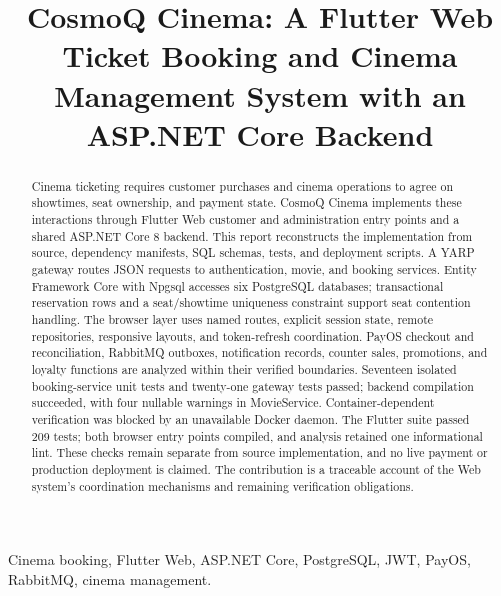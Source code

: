 \documentclass[conference]{IEEEtran}
\begin{document}
\title{CosmoQ Cinema: A Flutter Web Ticket Booking and Cinema Management System with an ASP.NET Core Backend}
\author{
}
\maketitle
\begin{abstract}
Cinema ticketing requires customer purchases and cinema operations to agree on
showtimes, seat ownership, and payment state. CosmoQ Cinema implements these
interactions through Flutter Web customer and administration entry points and
a shared ASP.NET Core 8 backend. This report reconstructs the implementation
from source, dependency manifests, SQL schemas, tests, and deployment scripts.
A YARP gateway routes JSON requests to authentication, movie, and booking
services. Entity Framework Core with Npgsql accesses six PostgreSQL databases;
transactional reservation rows and a seat/showtime uniqueness constraint support
seat contention handling. The browser layer uses named routes, explicit session
state, remote repositories, responsive layouts, and token-refresh coordination.
PayOS checkout and reconciliation, RabbitMQ outboxes, notification records,
counter sales, promotions, and loyalty functions are analyzed within their
verified boundaries. Seventeen isolated booking-service unit tests and
twenty-one gateway tests passed; backend compilation succeeded, with four
nullable warnings in MovieService. Container-dependent verification was blocked
by an unavailable Docker daemon. The Flutter suite passed 209 tests; both browser entry points compiled,
and analysis retained one informational lint. These checks remain separate
from source implementation, and no live payment or production
deployment is claimed. The contribution is a traceable account of the Web
system's coordination mechanisms and remaining verification obligations.
\end{abstract}
\begin{IEEEkeywords}
Cinema booking, Flutter Web, ASP.NET Core, PostgreSQL, JWT, PayOS, RabbitMQ, cinema management.
\end{IEEEkeywords}
\end{document}
